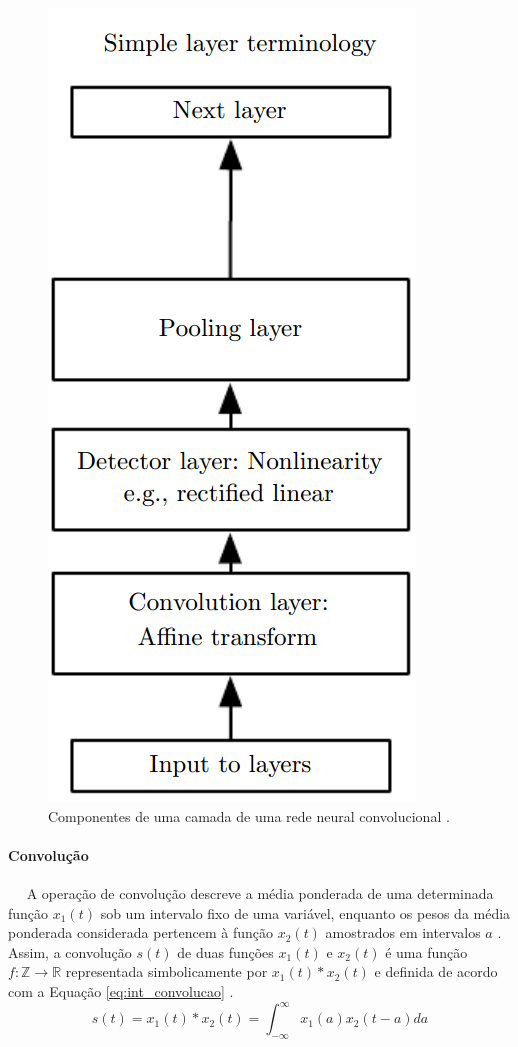 \begin{figure}[ht]
	\centering
	\includegraphics[height=0.3\textheight]{img/cnn_camada.png}
	\caption{Componentes de uma camada de uma rede neural convolucional \cite{goodfellow2016deep}. }
	\label{fig:cnn_camada}
\end{figure}


\paragraph{Convolução}
\ \ \newline
A operação de convolução descreve a média ponderada de uma determinada função $x_1(t)$ sob um intervalo fixo de uma variável, enquanto os pesos da média ponderada considerada pertencem à função $x_2(t)$ amostrados em intervalos $a$ \cite{bracewell1986fourier}. Assim, a convolução $s(t)$ de duas funções $x_1(t)$ e $x_2(t)$ é uma função $f: \mathds{Z} \rightarrow \mathds{R}$ representada simbolicamente por $x_1(t) * x_2(t)$ e definida de acordo com a Equação \ref{eq:int_convolucao} \cite{lathi2006sinais}.
\begin{equation}\label{eq:int_convolucao}
	s(t) = x_1(t) * x_2(t) = \int_{-\infty}^{\infty} x_1(a) x_2(t-a)da
\end{equation}

